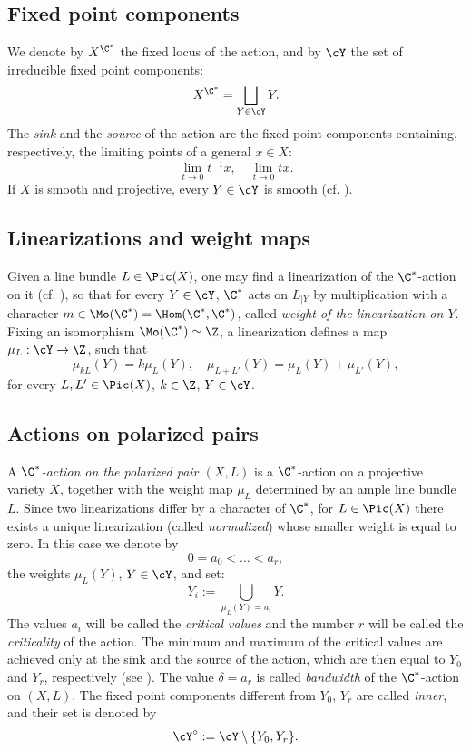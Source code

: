 \documentclass[reqno]{amsproc}
\theoremstyle{definition}
\begin{document}
\subsection{Fixed point components}\label{wors6:sssec:fxd} We denote by $X^{\C^*}$  the fixed locus of the action, and by $\cY$ the set of irreducible fixed point components: 
$$X^{\C^*}=\bigsqcup_{Y\in \cY}Y.$$ 
 The {\em sink} and the {\em source} of the action are the fixed point components containing, respectively, the limiting points of  a general $x \in X$:
$$
\lim_{t\to 0}t^{-1}x, \quad \lim_{t\to 0}tx.
$$
 If $X$ is smooth and projective, every $Y\in\cY$ is smooth (cf. \cite{wors6-IVERSEN}).


\subsection{Linearizations and weight maps}\label{wors6:sssec:lin} Given  a line bundle $L\in \Pic(X)$, one may find a linearization of the $\C^*$-action on it (cf. \cite{wors6-KKLV}), so that for every $Y\in \cY$, $\C^*$ acts on $L_{|Y}$ by multiplication with a character $m\in \Mo(\C^*)=\Hom(\C^*,\C^*)$, called {\em weight of the linearization on $Y$}. Fixing an isomorphism $\Mo(\C^*)\simeq \Z$, a linearization defines a map $\mu_L:\cY\to\Z$, such that 
$$
\mu_{kL}(Y)=k\mu_L(Y),\quad \mu_{L+L'}(Y)=\mu_{L}(Y)+\mu_{L'}(Y),
$$
for every $L,L'\in\Pic(X)$, $k\in \Z$, $Y\in \cY$.


\subsection{Actions on polarized pairs}\label{wors6:sssec:polar} A {\em $\C^*$-action on the polarized pair $(X,L)$}
is a $\C^*$-action on a projective variety $X$, together with the weight map $\mu_L$ determined by an ample line bundle $L$.  Since two linearizations differ by a character of $\C^*$, for $L \in \Pic(X)$ there exists a unique linearization (called {\em normalized})  whose smaller weight is equal to zero.
In this case we denote by 
$$
0=a_0<\dots<a_r,$$ 
the weights $\mu_L(Y)$, $Y\in\cY$,  
and set: 
$$
Y_i:=\bigcup_{\mu_L(Y)=a_i}Y.
$$ 
The values $a_i$ will be called the {\em critical values} and the number $r$ will be called the {\em criticality} of the action.
The minimum and maximum of the critical values are achieved only at the  sink and the  source of the action, which are then equal to $Y_0$ and $Y_r$, respectively (see \cite[Remark 2.12]{wors6-WORS1}). The value $\delta=a_r$ is called {\em bandwidth} of the $\C^*$-action on $(X,L)$. The fixed point components different from $Y_0$, $Y_r$ are called {\em inner}, and their set is denoted by $$\cY^\circ :=\cY\setminus\{Y_0,Y_r\}.$$
\end{document}
